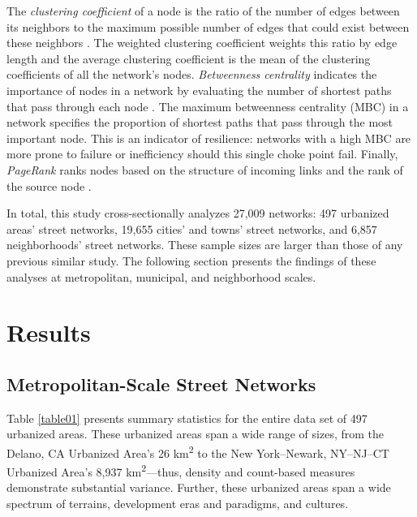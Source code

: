 \documentclass[Afour,sageh,times]{sagej}
\renewcommand{\cite}{\citep}
\begin{document}
The \emph{clustering coefficient} of a node is the ratio of the number of edges between its neighbors to the maximum possible number of edges that could exist between these neighbors \cite{jiang_topological_2004, opsahl_clustering_2009}. The weighted clustering coefficient weights this ratio by edge length and the average clustering coefficient is the mean of the clustering coefficients of all the network's nodes. \emph{Betweenness centrality} indicates the importance of nodes in a network by evaluating the number of shortest paths that pass through each node \cite{barthelemy_betweenness_2004,huang_trajgraph:_2016, zhong_revealing_2017}. The maximum betweenness centrality (MBC) in a network specifies the proportion of shortest paths that pass through the most important node. This is an indicator of resilience: networks with a high MBC are more prone to failure or inefficiency should this single choke point fail. Finally, \emph{PageRank} ranks nodes based on the structure of incoming links and the rank of the source node \cite{brin_anatomy_1998, jiang_predicting_2008, agryzkov_algorithm_2012, chin_geographically_2015, gleich_pagerank_2015}.

In total, this study cross-sectionally analyzes 27,009 networks: 497 urbanized areas' street networks, 19,655 cities' and towns' street networks, and 6,857 neighborhoods' street networks. These sample sizes are larger than those of any previous similar study. The following section presents the findings of these analyses at metropolitan, municipal, and neighborhood scales.


\section{Results}

\subsection{Metropolitan-Scale Street Networks}

Table \ref{table01} presents summary statistics for the entire data set of 497 urbanized areas. These urbanized areas span a wide range of sizes, from the Delano, CA Urbanized Area's 26 km\textsuperscript{2} to the New York--Newark, NY--NJ--CT Urbanized Area's 8,937 km\textsuperscript{2}---thus, density and count-based measures demonstrate substantial variance. Further, these urbanized areas span a wide spectrum of terrains, development eras and paradigms, and cultures.
\end{document}
